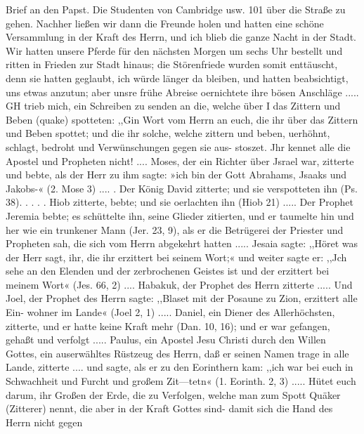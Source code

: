 {%
Brief an den Papst. Die Studenten von Cambridge usw. 101
über die Straße zu gehen. Nachher ließen wir dann die Freunde
holen und hatten eine schöne Versammlung in der Kraft des
Herrn, und ich blieb die ganze Nacht in der Stadt. Wir hatten
unsere Pferde für den nächsten Morgen um sechs Uhr bestellt
und ritten in Frieden zur Stadt hinaus; die Störenfriede wurden
somit enttäuscht, denn sie hatten geglaubt, ich würde länger da
bleiben, und hatten beabsichtigt, uns etwas anzutun; aber unsre
frühe Abreise oernichtete ihre bösen Anschläge .....
GH trieb mich, ein Schreiben zu senden an die, welche über
I das Zittern und Beben (quake) spotteten:
,,Gin Wort vom Herrn an euch, die ihr über das Zittern
und Beben spottet; und die ihr solche, welche zittern und beben,
uerhöhnt, schlagt, bedroht und Verwünschungen gegen sie aus-
stoszet. Jhr kennet alle die Apostel und Propheten nicht! ....
Moses, der ein Richter über Jsrael war, zitterte und bebte,
als der Herr zu ihm sagte: »ich bin der Gott Abrahams, Jsaaks
und Jakobs-« (2. Mose 3) .... . Der König David zitterte;
und sie verspotteten ihn (Ps. 38). . . . . Hiob zitterte, bebte;
und sie oerlachten ihn (Hiob 21) ..... Der Prophet Jeremia
bebte; es schüttelte ihn, seine Glieder zitierten, und er taumelte
hin und her wie ein trunkener Mann (Jer. 23, 9), als er die
Betrügerei der Priester und Propheten sah, die sich vom Herrn
abgekehrt hatten ..... Jesaia sagte: ,,Höret was der Herr
sagt, ihr, die ihr erzittert bei seinem Wort;« und weiter sagte er:
,,Jch sehe an den Elenden und der zerbrochenen Geistes ist und
der erzittert bei meinem Wort« (Jes. 66, 2) .... Habakuk, der
Prophet des Herrn zitterte ..... Und Joel, der Prophet des
Herrn sagte: ,,Blaset mit der Posaune zu Zion, erzittert alle Ein-
wohner im Lande« (Joel 2, 1) ..... Daniel, ein Diener des
Allerhöchsten, zitterte, und er hatte keine Kraft mehr (Dan. 10, 16);
und er war gefangen, gehaßt und verfolgt .....
Paulus, ein Apostel Jesu Christi durch den Willen Gottes, ein
auserwähltes Rüstzeug des Herrn, daß er seinen Namen trage in
alle Lande, zitterte .... und sagte, als er zu den Eorinthern
kam: ,,ich war bei euch in Schwachheit und Furcht und großem
Zit—tetn« (1. Eorinth. 2, 3) .....
Hütet euch darum, ihr Großen der Erde, die zu Verfolgen,
welche man zum Spott Quäker (Zitterer) nennt, die aber in der
Kraft Gottes sind- damit sich die Hand des Herrn nicht gegen


}
